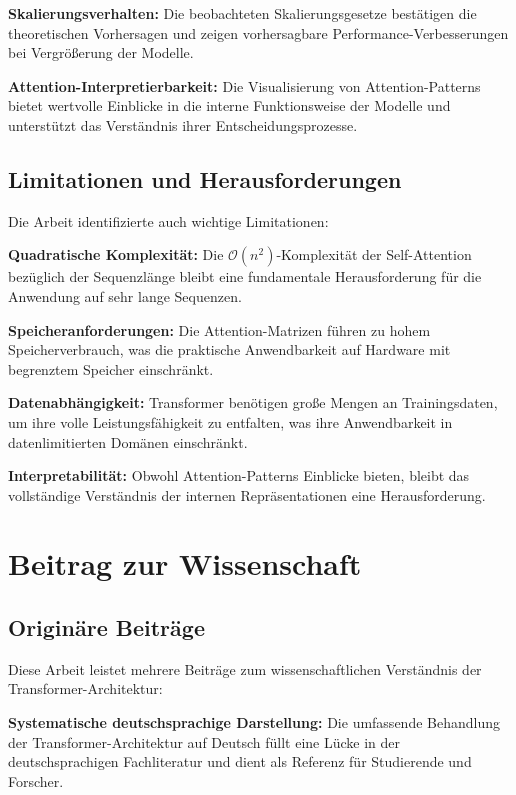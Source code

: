 \textbf{Skalierungsverhalten:} Die beobachteten Skalierungsgesetze bestätigen die theoretischen Vorhersagen und zeigen vorhersagbare Performance-Verbesserungen bei Vergrößerung der Modelle.

\textbf{Attention-Interpretierbarkeit:} Die Visualisierung von Attention-Patterns bietet wertvolle Einblicke in die interne Funktionsweise der Modelle und unterstützt das Verständnis ihrer Entscheidungsprozesse.

\subsection{Limitationen und Herausforderungen}

Die Arbeit identifizierte auch wichtige Limitationen:

\textbf{Quadratische Komplexität:} Die $\mathcal{O}(n^2)$-Komplexität der Self-Attention bezüglich der Sequenzlänge bleibt eine fundamentale Herausforderung für die Anwendung auf sehr lange Sequenzen.

\textbf{Speicheranforderungen:} Die Attention-Matrizen führen zu hohem Speicherverbrauch, was die praktische Anwendbarkeit auf Hardware mit begrenztem Speicher einschränkt.

\textbf{Datenabhängigkeit:} Transformer benötigen große Mengen an Trainingsdaten, um ihre volle Leistungsfähigkeit zu entfalten, was ihre Anwendbarkeit in datenlimitierten Domänen einschränkt.

\textbf{Interpretabilität:} Obwohl Attention-Patterns Einblicke bieten, bleibt das vollständige Verständnis der internen Repräsentationen eine Herausforderung.

\section{Beitrag zur Wissenschaft}

\subsection{Originäre Beiträge}

Diese Arbeit leistet mehrere Beiträge zum wissenschaftlichen Verständnis der Transformer-Architektur:

\textbf{Systematische deutschsprachige Darstellung:} Die umfassende Behandlung der Transformer-Architektur auf Deutsch füllt eine Lücke in der deutschsprachigen Fachliteratur und dient als Referenz für Studierende und Forscher.

